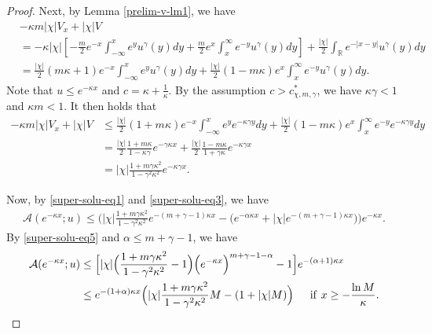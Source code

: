 \documentclass[11pt]{article} %
\theoremstyle{remark}
\theoremstyle{remark}
\numberwithin{equation}{section}
\numberwithin{figure}{section}
\numberwithin{table}{section}
\def\R{\mathbb R}
\begin{document}
\begin{proof}
Next, by Lemma \ref{prelim-v-lm1}, we have
\begin{align*}
&-\kappa m |\chi| V_x+|\chi|V\\
&= -\kappa |\chi|\left[ -\frac{m }{2}e^{- x}\int_{-\infty}^xe^{ y}u^\gamma (y)dy + \frac{m }{2}e^{x}\int_{x}^{\infty}e^{- y}u^\gamma (y)dy\right]+ \frac{|\chi| }{2}\int_{\R}e^{- |x-y|}u^\gamma (y)dy
\\
&=\frac{|\chi|}{2}(m\kappa +1)e^{-x}\int_{-\infty}^ x e^y u^\gamma (y)dy +\frac{|\chi|}{2}(1-m\kappa)e^{x}\int_x^\infty e^{-y} u^\gamma (y)dy.
\end{align*}
Note that $u\le e^{-\kappa x}$ and  $c=\kappa+\frac{1}{\kappa}$. By the assumption $c>c^*_{\chi,m,\gamma}$,  we have  $\kappa \gamma <1$ and $\kappa m<1$.
It then  holds that
\begin{align}
\label{super-solu-eq3}
-\kappa m |\chi| V_x+|\chi|V&\le   \frac{|\chi|}{2}(1+m\kappa )e^{-x}\int_{-\infty}^ x e^y e^{-\kappa \gamma y} dy +  \frac{|\chi|}{2}(1-m\kappa)e^{x}\int_x^\infty e^{-y} e^{-\kappa \gamma y}dy\nonumber\\
&=\frac{|\chi|}{2}\frac{1+m \kappa}{1-\kappa\gamma } e^{-\gamma \kappa x}+\frac{ |\chi|}{2}\frac{1-m \kappa}{1+\gamma \kappa} e^{-\kappa\gamma  x}\nonumber\\
&= |\chi| \frac{1+m\gamma \kappa^2}{1-\gamma^2 \kappa^2} e^{-\kappa\gamma  x}.
\end{align}



\smallskip

Now, by \eqref{super-solu-eq1} and \eqref{super-solu-eq3},  we have
\begin{align}
\label{super-solu-eq5}
\mathcal{A} (e^{-\kappa x};u)
\le  \Big (    |\chi| \frac{1+m\gamma \kappa^2}{1-\gamma^2 \kappa^2} e^{-(m+\gamma-1)\kappa  x} -\big( e^{- \alpha \kappa x} +|\chi| e^{-(m+\gamma -1)\kappa x}\big)\Big) e^{-\kappa x}.
\end{align}
By \eqref{super-solu-eq5} and $\alpha\le m+\gamma-1$, we have 
\begin{align}
\label{super-solu-eq7}
\mathcal{A} (e^{-\kappa x};u)&\le   \Big [   |\chi|\Big( \frac{1+m\gamma \kappa^2}{1-\gamma^2 \kappa^2} -1\Big)\Big( e^{-\kappa x}\Big)^{m+\gamma -1-\alpha} -1\Big] e^{-(\alpha+1)\kappa x}  \nonumber\\
&\le  e^{-(1+\alpha )\kappa x}
\Big( |\chi| \frac{1+m \gamma \kappa^2}{1-\gamma^2 \kappa ^2} M -(1+|\chi| M)\Big)\,\,\, \quad {\rm if}\,\, x\ge -\frac{\ln M}{\kappa}.
\end{align}




\end{proof}
\end{document}
